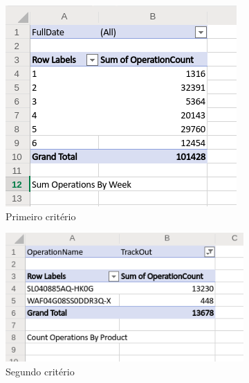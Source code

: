 \begin{figure}
\centering
    \begin{subfigure}{.55\textwidth}
        \centering
        \includegraphics[width=\textwidth]{ch06/assets/expected01.png}
        \caption{Primeiro critério}
     \end{subfigure}
     \begin{subfigure}{.55\textwidth}
         \centering
        \includegraphics[width=\textwidth]{ch06/assets/expected02.png}
        \caption{Segundo critério}
     \end{subfigure}
     \begin{subfigure}{.55\textwidth}
        \centering

\end{subfigure}
\end{figure}
